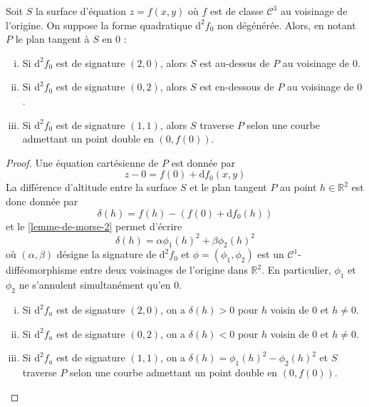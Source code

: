 
	\begin{application}
		Soit $S$ la surface d'équation $z = f(x, y)$ où $f$ est de classe $\mathcal{C}^3$ au voisinage de l'origine. On suppose la forme quadratique $\mathrm{d}^2 f_0$ non dégénérée. Alors, en notant $P$ le plan tangent à $S$ en $0$ :
		\begin{enumerate}[(i)]
			\item Si $\mathrm{d}^2 f_0$ est de signature $(2, 0)$, alors $S$ est au-dessus de $P$ au voisinage de $0$.
			\item Si $\mathrm{d}^2 f_0$ est de signature $(0, 2)$, alors $S$ est en-dessous de $P$ au voisinage de $0$.
			\item Si $\mathrm{d}^2 f_0$ est de signature $(1, 1)$, alors $S$ traverse $P$ selon une courbe admettant un point double en $(0, f(0))$.
		\end{enumerate}
	\end{application}

	\begin{proof}
		Une équation cartésienne de $P$ est donnée par
		\[ z - 0 = f(0) + \mathrm{d} f_0(x, y) \]
		La différence d'altitude entre la surface $S$ et le plan tangent $P$ au point $h \in \mathbb{R}^2$ est donc donnée par
		\[ \delta(h) = f(h) - (f(0) + \mathrm{d}f_0(h)) \]
		et le \cref{lemme-de-morse-2} permet d'écrire
		\[ \delta(h) = \alpha \phi_1(h)^2 + \beta \phi_2(h)^2 \]
		où $(\alpha, \beta)$ désigne la signature de $\mathrm{d}^2 f_0$ et $\phi = (\phi_1, \phi_2)$ est un $\mathcal{C}^1$-difféomorphisme entre deux voisinages de l'origine dans $\mathbb{R}^2$. En particulier, $\phi_1$ et $\phi_2$ ne s'annulent simultanément qu'en $0$.
		\begin{enumerate}[(i)]
			\item Si $\mathrm{d}^2 f_a$ est de signature $(2, 0)$, on a $\delta(h) > 0$ pour $h$ voisin de $0$ et $h \neq 0$.
			\item Si $\mathrm{d}^2 f_a$ est de signature $(0, 2)$, on a $\delta(h) < 0$ pour $h$ voisin de $0$ et $h \neq 0$.
			\item Si $\mathrm{d}^2 f_a$ est de signature $(1, 1)$, on a $\delta(h) = \phi_1(h)^2 - \phi_2(h)^2$ et $S$ traverse $P$ selon une courbe admettant un point double en $(0, f(0))$.
		\end{enumerate}
	\end{proof}

